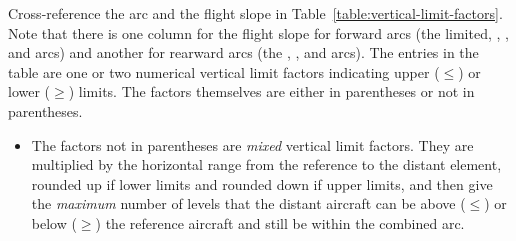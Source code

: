 {%
%
%
%
%

Cross-reference the arc and the flight slope in Table~\ref{table:vertical-limit-factors}. Note that there is one column for the flight slope for forward arcs (the limited, , , and  arcs) and another for rearward arcs (the ,  , and   arcs). The entries in the table are one or two numerical vertical limit factors indicating upper ($\le$) or lower ($\ge$) limits. The factors themselves are either in parentheses or not in parentheses.

\begin{itemize}

\item
The factors not in parentheses are \emph{mixed} vertical limit factors. They are multiplied by the horizontal range from the reference to the distant element, rounded up if lower limits and rounded down if upper limits, and then give the \emph{maximum} number of levels that the distant aircraft can be above ($\le$) or below ($\ge$) the reference aircraft and still be within the combined arc. 


\end{itemize}}
